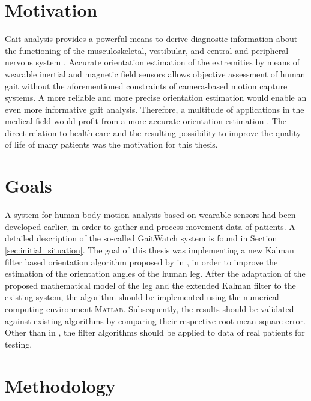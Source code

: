 \section{Motivation}

Gait analysis provides a powerful means to derive diagnostic information about the functioning of the musculoskeletal, vestibular, and central and peripheral nervous system \cite{bennett_extended_2013}. Accurate orientation estimation of the extremities by means of wearable inertial and magnetic field sensors allows objective assessment of human gait without the aforementioned constraints of camera-based motion capture systems. A more reliable and more precise orientation estimation would enable an even more informative gait analysis. Therefore, a multitude of applications in the medical field would profit from a more accurate orientation estimation \cite{wong_clinical_2007}. The direct relation to health care and the resulting possibility to improve the quality of life of many patients was the motivation for this thesis.

\section{Goals}

A system for human body motion analysis based on wearable sensors had been developed earlier, in order to gather and process  movement data of patients. A detailed description of the so-called GaitWatch system is found in Section \ref{sec:initial_situation}. The goal of this thesis was implementing a new Kalman filter based orientation algorithm proposed by \citeauthor{bennett_motion_2014} in \cite{bennett_motion_2014}, in order to improve the estimation of the orientation angles of the human leg. After the adaptation of the proposed mathematical model of the leg and the extended Kalman filter to the existing system, the algorithm should be implemented using the numerical computing environment \textsc{Matlab}\textsuperscript{\textregistered}. Subsequently, the results should be validated against existing algorithms by comparing their respective root-mean-square error. Other than in \cite{bennett_motion_2014}, the filter algorithms should be applied to data of real patients for testing.

\section{Methodology}

